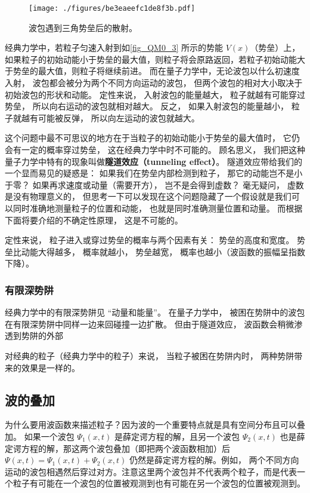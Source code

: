 \begin{figure}[ht]
\centering
\texttt{[image: ./figures/be3eaeefc1de8f3b.pdf]}
\caption{波包遇到三角势垒后的散射。} \label{fig_QM0_3} %
\end{figure}

经典力学中，若粒子匀速入射到如\autoref{fig_QM0_3} 所示的势能 $V(x)$（势垒）上， 如果粒子的初始动能小于势垒的最大值，则粒子将会原路返回，若粒子初始动能大于势垒的最大值，则粒子将继续前进。 而在量子力学中，无论波包以什么初速度入射， 波包都会被分为两个不同方向运动的波包， 但两个波包的相对大小取决于初始波包的形状和动能。 定性来说， 入射波包的能量越大， 粒子就越有可能穿过势垒， 所以向右运动的波包就相对越大。 反之， 如果入射波包的能量越小， 粒子就越有可能被反弹， 所以向左运动的波包就越大。

这个问题中最不可思议的地方在于当粒子的初始动能小于势垒的最大值时， 它仍会有一定的概率穿过势垒， 这在经典力学中时不可能的。 顾名思义， 我们把这种量子力学中特有的现象叫做\textbf{隧道效应（tunneling effect）}。 隧道效应带给我们的一个显而易见的疑惑是： 如果我们在势垒内部检测到粒子， 那它的动能岂不是小于零？ 如果再求速度或动量（需要开方）， 岂不是会得到虚数？ 毫无疑问， 虚数是没有物理意义的， 但思考一下可以发现在这个问题隐藏了一个假设就是我们可以同时准确地测量粒子的位置和动能， 也就是同时准确测量位置和动量。 而根据下面将要介绍的不确定性原理， 这是不可能的。

定性来说， 粒子进入或穿过势垒的概率与两个因素有关： 势垒的高度和宽度。 势垒比动能大得越多， 概率就越小， 势垒越宽， 概率也越小（波函数的振幅呈指数下降）。

\subsubsection{有限深势阱}
经典力学中的有限深势阱见 “动量和能量”。 在量子力学中， 被困在势阱中的波包在有限深势阱中同样一边来回碰撞一边扩散。 但由于隧道效应， 波函数会稍微渗透到势阱的外部

对经典的粒子（经典力学中的粒子）来说， 当粒子被困在势阱内时， 两种势阱带来的效果是一样的。


\subsection{波的叠加}
为什么要用波函数来描述粒子？因为波的一个重要特点就是具有空间分布且可以叠加。 如果一个波包 $\Psi_1(x, t)$ 是薛定谔方程的解，且另一个波包 $\Psi_2(x, t)$ 也是薛定谔方程的解，那这两个波包叠加（即把两个波函数相加）后 $\Psi(x, t) = \Psi_1(x, t) + \Psi_2(x, t)$ 仍然是薛定谔方程的解。例如， 两个不同方向运动的波包相遇然后穿过对方。注意这里两个波包并不代表两个粒子，而是代表一个粒子有可能在一个波包的位置被观测到也有可能在另一个波包的位置被观测到。

